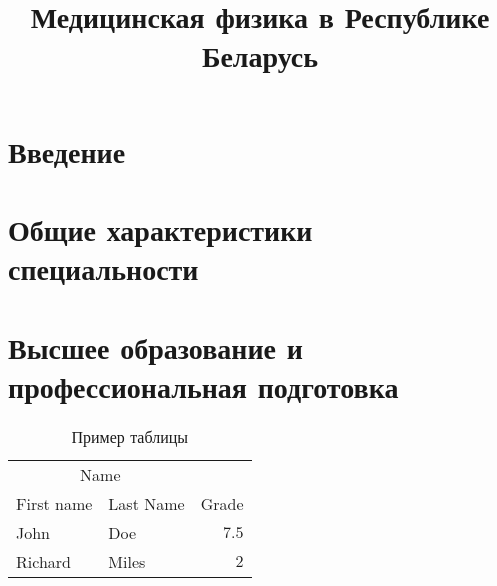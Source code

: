 \documentclass[a4paper,10pt]{extarticle}
\title{Медицинская физика в Республике Беларусь} %
\begin{document}
\maketitle


\section{Введение}




\section{Общие характеристики специальности}







\section{Высшее образование и профессиональная подготовка}

\begin{table}
\caption{Пример таблицы}
\centering
\begin{tabular}{llr}
\toprule
\multicolumn{2}{c}{Name} \\
\cmidrule(r){1-2}
First name & Last Name & Grade \\
\midrule
John & Doe & $7.5$ \\
Richard & Miles & $2$ \\
\bottomrule
\end{tabular}
\end{table}

%


\end{document}
